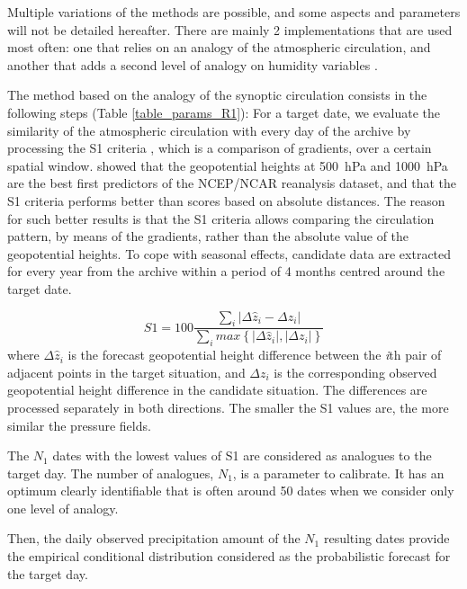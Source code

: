 \documentclass[twocol]{ametsoc}
\begin{document}
Multiple variations of the methods are possible, and some aspects and parameters will not be detailed hereafter. There are mainly 2 implementations that are used most often: one that relies on an analogy of the atmospheric circulation, and another that adds a second level of analogy on humidity variables \citep{Obled2002, Bontron2005, Marty2012}.

The method based on the analogy of the synoptic circulation consists in the following steps (Table \ref{table_params_R1}): For a target date, we evaluate the similarity of the atmospheric circulation with every day of the archive by processing the S1 criteria \citep[Eq.\ (\ref{eq:S1}), ][]{Teweles1954, Drosdowsky2003}, which is a comparison of gradients, over a certain spatial window. \citet{Bontron2005} showed that the geopotential heights at 500~hPa and 1000~hPa are the best first predictors of the NCEP/NCAR reanalysis dataset, and that the S1 criteria performs better than scores based on absolute distances. The reason for such better results is that the S1 criteria allows comparing the circulation pattern, by means of the gradients, rather than the absolute value of the geopotential heights. To cope with seasonal effects, candidate data are extracted for every year from the archive within a period of 4 months centred around the target date.

\begin{equation}
\label{eq:S1}
S1=100 \frac {\displaystyle \sum_{i} \vert \Delta\hat{z}_{i} - \Delta z_{i} \vert}
{\displaystyle \sum_{i} max\left\lbrace \vert \Delta\hat{z}_{i} \vert , \vert \Delta z_{i} \vert \right\rbrace }
\end{equation}
where $\Delta \hat{z}_{i}$ is the forecast geopotential height difference between the \textit{i}th pair of adjacent points in the target situation, and $\Delta z_{i}$ is the corresponding observed geopotential height difference in the candidate situation. The differences are processed separately in both directions. The smaller the S1 values are, the more similar the pressure fields.

The $N_{1}$ dates with the lowest values of S1 are considered as analogues to the target day. The number of analogues, $N_{1}$, is a parameter to calibrate. It has an optimum clearly identifiable that is often around 50 dates when we consider only one level of analogy.

Then, the daily observed precipitation amount of the $N_{1}$ resulting dates provide the empirical conditional distribution considered as the probabilistic forecast for the target day.
\end{document}
